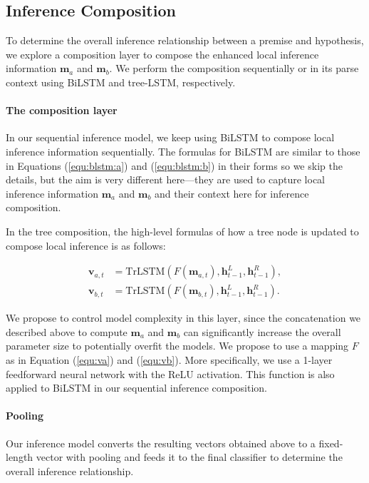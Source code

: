 \documentclass[11pt,a4paper]{article}
\newcommand{\vect}[1]{\mathbf{#1}}
\begin{document}
\subsection{Inference Composition}
To determine the overall inference relationship between a premise and hypothesis, we explore a composition layer to compose the enhanced local inference information $\vect{m}_a$ and $\vect{m}_b$. We perform the composition sequentially or in its parse context using BiLSTM and tree-LSTM, respectively. 

\paragraph{The composition layer}
\label{sec:composition}

In our sequential inference model, we keep using BiLSTM to compose local inference information sequentially. The formulas for BiLSTM are similar to those in Equations (\ref{equ:blstm:a}) and (\ref{equ:blstm:b}) in their forms so we skip the details, but the aim is very different here---they are used to capture local inference information $\vect{m}_a$ and $\vect{m}_b$ and their context here for inference composition.  

In the tree composition, the high-level formulas of how a tree node is updated to compose local inference is as follows:  

{\fontsize{10pt}{1.0cm}
	\begin{align}
    \label{equ:va}
		\vect{v}_{a,t}&=\text{TrLSTM}(F(\vect{m}_{a,t}), \vect{h}_{t-1}^L, \vect{h}_{t-1}^R),\\
		\vect{v}_{b,t}&=\text{TrLSTM}(F(\vect{m}_{b,t}), \vect{h}_{t-1}^L, \vect{h}_{t-1}^R).	
     \label{equ:vb}
    \end{align}
}

\noindent We propose to control model complexity in this layer, since the concatenation we described above to compute $\vect{m}_a$ and $\vect{m}_b$ can significantly increase the overall parameter size to potentially overfit the models. We propose to use a mapping $F$ as in Equation (\ref{equ:va}) and (\ref{equ:vb}). More specifically, we use a 1-layer feedforward neural network with the ReLU activation. This function is also applied to BiLSTM in our sequential inference composition. 

\paragraph{Pooling}
Our inference model converts the resulting vectors obtained above to a fixed-length vector with pooling and feeds it to the final classifier to determine the overall inference relationship. 
\end{document}
